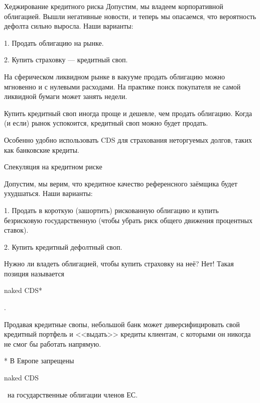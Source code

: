 \documentclass{beamer}
\newcommand{\en}[1]{\begin{otherlanguage}{english}#1\end{otherlanguage}}
\begin{document}
\begin{frame}{Хеджирование кредитного риска}
\justify
Допустим, мы владеем корпоративной облигацией. Вышли негативные новости, и теперь мы опасаемся, что вероятность дефолта сильно выросла. Наши варианты:

1. Продать облигацию на рынке.

2. Купить страховку --- кредитный своп.

\justify
На сферическом ликвидном рынке в вакууме продать облигацию можно мгновенно и с нулевыми расходами. На практике поиск покупателя не самой ликвидной бумаги может занять недели.

\justify
Купить кредитный своп иногда проще и дешевле, чем продать облигацию. Когда (и если) рынок успокоится, кредитный своп можно будет продать.

\justify
Особенно удобно использовать CDS для страхования неторгуемых долгов, таких как банковские кредиты.
\end{frame}



\begin{frame}{Спекуляция на кредитном риске}

\justify
Допустим, мы верим, что кредитное качество референсного заёмщика будет ухудшаться. Наши варианты:

1. Продать в короткую (зашортить) рискованную облигацию и купить безрисковую государственную (чтобы убрать риск общего движения процентных ставок).

2. Купить кредитный дефолтный своп.

\justify
Нужно ли владеть облигацией, чтобы купить страховку на неё? Нет! Такая позиция называется \en{naked CDS*}.

\justify
Продавая кредитные свопы, небольшой банк может диверсифицировать свой кредитный 
портфель и <<выдать>> кредиты клиентам, с которыми он никогда не смог бы работать
напрямую.

\justify
* В Европе запрещены \en{naked CDS}\ на государственные облигации членов ЕС.
\end{frame}


\renewcommand{\swapPartyNode}[4]{

	\draw (#1, #2)
		node[
			rectangle,
			draw,
			rounded corners,
			anchor = south,
			minimum height = 0.8cm,
			minimum width = 2.8cm
		]
		(#4)
		{#3};
}

\newcommand{\paymentFlow}[4] {
	\draw [
		->,
		>=triangle 90
	]
	(#1) -- (#2)
	node[
		pos = 0.5,
		anchor = #4
	]
	{#3};
}
\end{document}
